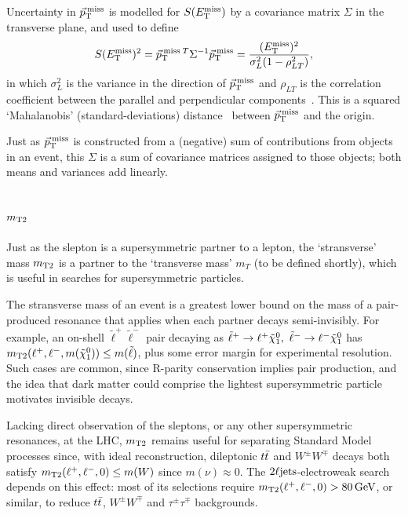 Uncertainty in $\ptmiss$ is modelled for $\metsig$ by a covariance matrix
$\Sigma$ in the transverse plane, and used to define
\begin{equation}
\metsig^2
=
\ptmiss\,{}^T \Sigma^{-1} \ptmiss
=
\frac{(\met)^2}{\sigma_L^2(1 - \rho_{LT}^2)}
,
\end{equation}
in which $\sigma_L^2$ is the variance in the direction of $\ptmiss$ and
$\rho_{LT}$ is the correlation coefficient between the parallel and
perpendicular components~\cite{atlas_met_significance}.
This is a squared `Mahalanobis' (standard-deviations)
distance~\cite{mahalanobis1936generalised} between $\ptmiss$ and the origin.

Just as $\ptmiss$ is constructed from a (negative) sum of contributions from
objects in an event, this $\Sigma$ is a sum of covariance matrices assigned to
those objects; both means and variances add linearly.


\subsection{\texorpdfstring{$\mttwo$}{mT2}}
\label{sec:2ljets_mt2}
Just as the slepton is a supersymmetric partner to a lepton, the `stransverse'
mass $\mttwo$ is a partner to the `transverse mass' $m_T$
(to be defined shortly),
which is useful in searches for supersymmetric particles.

The stransverse mass of an event is a greatest lower bound on the mass of a
pair-produced resonance that applies when each partner decays semi-invisibly.
For example, an on-shell $\tilde\ell^+\tilde\ell^-$ pair decaying as
$\tilde\ell^+ \to \ell^+ \neutralino_1
,~
\tilde\ell^- \to \ell^- \neutralino_1$ has
$\mttwo(\ell^+, \ell^-, m(\neutralino_1)) \leq m(\tilde\ell)$, plus some error
margin for experimental resolution.
Such cases are common, since R-parity conservation implies pair production,
and the idea that dark matter could comprise the lightest supersymmetric
particle motivates invisible decays.

Lacking direct observation of the sleptons, or any other supersymmetric
resonances, at the LHC, $\mttwo$ remains useful for separating Standard Model
processes since, with ideal reconstruction,
dileptonic $\ttbar$ and $W^\pm W^\mp$ decays both
satisfy $\mttwo(\ell^+, \ell^-, 0) \leq m(W)$ since $m(\nu) \approx 0$.
The $\twoljets$-electroweak search depends on this effect:
most of its selections require $\mttwo(\ell^+, \ell^-, 0) > 80\,\eV[G]$,
or similar,
to reduce $\ttbar$, $W^\pm W^\mp$ and $\tau^\pm\tau^\mp$ backgrounds.

